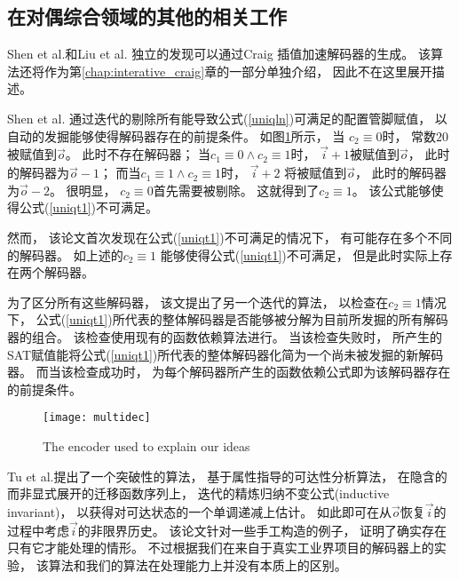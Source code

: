 \subsection{在对偶综合领域的其他的相关工作}

Shen et al.和Liu et al. 独立的发现可以通过Craig 插值加速解码器的生成。
该算法还将作为第\ref{chap:interative_craig}章的一部分单独介绍，
因此不在这里展开描述。

Shen et al.
通过迭代的剔除所有能导致公式(\ref{uniqln})可满足的配置管脚赋值，
以自动的发掘能够使得解码器存在的前提条件。
如图\ref{multidec}所示，
当 $c_2\equiv 0$时，
常数$20$被赋值到$\vec{o}$。
此时不存在解码器；
当$c_1\equiv 0\wedge c_2\equiv 1$时，
$\vec{i}+1$被赋值到$\vec{o}$，
此时的解码器为$\vec{o}-1$；
而当$c_1\equiv 1\wedge c_2\equiv 1$时，
$\vec{i}+2$ 将被赋值到$\vec{o}$，
此时的解码器为$\vec{o}-2$。
很明显，
$c_2\equiv 0$首先需要被剔除。
这就得到了$c_2\equiv 1$。
该公式能够使得公式(\ref{uniqt1})不可满足。

然而，
该论文首次发现在公式(\ref{uniqt1})不可满足的情况下，
有可能存在多个不同的解码器。
如上述的$c_2\equiv 1$
能够使得公式(\ref{uniqt1})不可满足，
但是此时实际上存在两个解码器。

为了区分所有这些解码器，
该文提出了另一个迭代的算法，
以检查在$c_2\equiv 1$情况下，
公式(\ref{uniqt1})所代表的整体解码器是否能够被分解为目前所发掘的所有解码器的组合。
该检查使用现有的函数依赖算法进行。
当该检查失败时，
所产生的SAT赋值能将公式(\ref{uniqt1})所代表的整体解码器化简为一个尚未被发掘的新解码器。
而当该检查成功时，
为每个解码器所产生的函数依赖公式即为该解码器存在的前提条件。

\begin{figure}[t]
\begin{center}
\texttt{[image: multidec]}
\end{center}
\caption{The encoder used to explain our ideas}
  \label{multidec}
\end{figure}

Tu et al.提出了一个突破性的算法，
基于属性指导的可达性分析算法，
在隐含的而非显式展开的迁移函数序列上，
迭代的精炼归纳不变公式(inductive invariant)，
以获得对可达状态的一个单调递减上估计。
如此即可在从$\vec{o}$恢复$\vec{i}$的过程中考虑$\vec{i}$的非限界历史。
该论文针对一些手工构造的例子，
证明了确实存在只有它才能处理的情形。
不过根据我们在来自于真实工业界项目的解码器上的实验，
该算法和我们的算法在处理能力上并没有本质上的区别。



